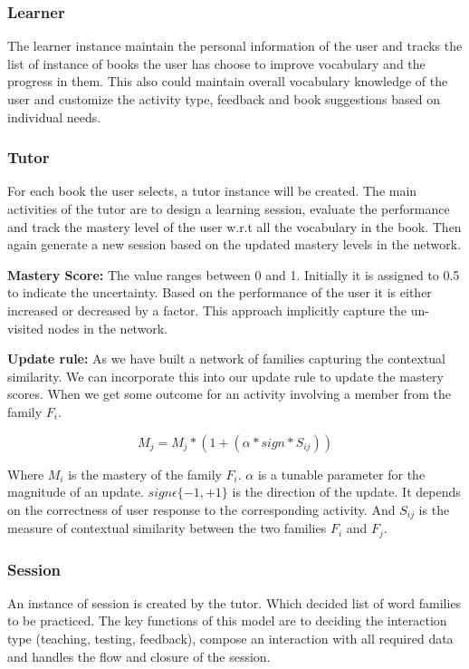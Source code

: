 \documentclass[11pt,a4paper]{article}
\begin{document}
\subsubsection{Learner}
The learner instance maintain the personal information of the user and tracks
the list of instance of books the user has choose to improve vocabulary and the
progress in them. This also could maintain overall vocabulary knowledge of
the user and customize the activity type, feedback and book suggestions based
on individual needs.

\subsubsection{Tutor}
For each book the user selects, a tutor instance will be created. The main
activities of the tutor are to design a learning session, evaluate the
performance and track the mastery level of the user w.r.t all the vocabulary
in the book. Then again generate a new session based on the updated mastery
levels in the network.

\textbf{Mastery Score:} The value ranges between 0 and 1. Initially it is
assigned to 0.5 to indicate the uncertainty. Based on the performance of the
user it is either increased or decreased by a factor. This approach implicitly
capture the un-visited nodes in the network.

\textbf{Update rule:} As we have built a network of families capturing the
contextual similarity. We can incorporate this into our update rule to update
the mastery scores. When we get some outcome for an activity involving a member
from the family ${F_i}$.

\begin{equation}
  M_j = M_j * (1 + (\alpha * sign * S_{ij}))
\end{equation}

Where ${M_i}$ is the mastery of the family ${F_i}$. ${\alpha}$ is a tunable parameter
for the magnitude of an update. ${sign \epsilon \{-1, +1\}}$ is the direction 
of the update. It depends on the correctness of user response to the corresponding
activity. And ${S_{ij}}$ is the measure of contextual similarity between the two
families ${F_i}$ and ${F_j}$.

\subsubsection{Session}
An instance of session is created by the tutor. Which decided list of word
families to be practiced. The key functions of this model are to deciding the
interaction type (teaching, testing, feedback), compose an interaction with all
required data and handles the flow and closure of the session.
\end{document}
